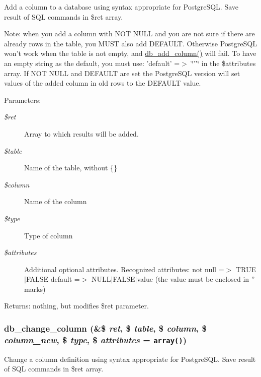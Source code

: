 Add a column to a database using syntax appropriate for PostgreSQL. Save result of SQL commands in \$ret array.

Note: when you add a column with NOT NULL and you are not sure if there are already rows in the table, you MUST also add DEFAULT. Otherwise PostgreSQL won't work when the table is not empty, and \hyperlink{update_8php_68749bcc3e7949ede51c5dd2db91f39e}{db\_\-add\_\-column()} will fail. To have an empty string as the default, you must use: 'default' =$>$ \char`\"{}''\char`\"{} in the \$attributes array. If NOT NULL and DEFAULT are set the PostgreSQL version will set values of the added column in old rows to the DEFAULT value.

\begin{Desc}
\item[Parameters:]
\begin{description}
\item[{\em \$ret}]Array to which results will be added. \item[{\em \$table}]Name of the table, without \{\} \item[{\em \$column}]Name of the column \item[{\em \$type}]Type of column \item[{\em \$attributes}]Additional optional attributes. Recognized attributes: not null =$>$ TRUE$|$FALSE default =$>$ NULL$|$FALSE$|$value (the value must be enclosed in '' marks) \end{description}
\end{Desc}
\begin{Desc}
\item[Returns:]nothing, but modifies \$ret parameter. \end{Desc}
\hypertarget{update_8php_f6bd7fe55aa398bb18266c56be8bf97b}{
\subsubsection[{db\_\-change\_\-column}]{\setlength{\rightskip}{0pt plus 5cm}db\_\-change\_\-column (\&\$ {\em ret}, \/  \$ {\em table}, \/  \$ {\em column}, \/  \$ {\em column\_\-new}, \/  \$ {\em type}, \/  \$ {\em attributes} = {\tt array()})}}
\label{update_8php_f6bd7fe55aa398bb18266c56be8bf97b}


Change a column definition using syntax appropriate for PostgreSQL. Save result of SQL commands in \$ret array.

